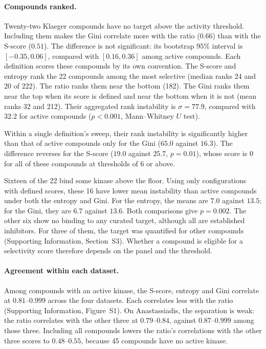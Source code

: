 \paragraph{Compounds ranked.} Twenty-two Klaeger compounds have no target above
the activity threshold. Including them makes the Gini correlate more with
the ratio ($0.66$) than with the S-score ($0.51$). The difference is not
significant: its bootstrap $95\%$ interval is $[-0.35, 0.06]$, compared with
$[0.16, 0.36]$ among active compounds. Each definition scores these compounds
by its own convention. The S-score and entropy rank the 22 compounds among
the most selective (median ranks 24 and 20 of 222). The ratio ranks them near
the bottom (182). The Gini ranks them near the top when its score is defined
and near the bottom when it is not (mean ranks 32 and 212). Their aggregated
rank instability is $\sigma = 77.9$, compared with $32.2$ for active compounds
($p < 0.001$, Mann--Whitney $U$ test).

Within a single definition's sweep, their rank instability is significantly
higher than that of active compounds only for the Gini ($65.0$ against
$16.3$). The difference reverses for the S-score ($19.0$ against
$25.7$, $p = 0.01$), whose score is $0$ for all of these compounds at
thresholds of 6 or above.

Sixteen of the 22 bind some kinase above the floor. Using only configurations
with defined scores, these 16 have lower mean instability than active
compounds under both the entropy and Gini. For the entropy, the means are
$7.0$ against $13.5$; for the Gini, they are $6.7$ against $13.6$. Both
comparisons give $p = 0.002$. The other six show no binding
to any curated target, although all are established
inhibitors. For three of them, the target was quantified for other compounds
(Supporting Information, Section~S3). Whether a compound is
eligible for a selectivity score therefore depends on the panel and the
threshold.

\paragraph{Agreement within each dataset.} Among compounds with an active kinase, the
S-score, entropy and Gini correlate at $0.81$--$0.999$ across the four
datasets. Each correlates less with the ratio (Supporting Information,
Figure~S1). On
Anastassiadis, the separation is weak: the ratio correlates with the other three
at $0.79$--$0.84$, against $0.87$--$0.999$ among those three. Including all
compounds lowers the ratio's correlations with the other three scores to
$0.48$--$0.55$, because 45 compounds have no active kinase.

